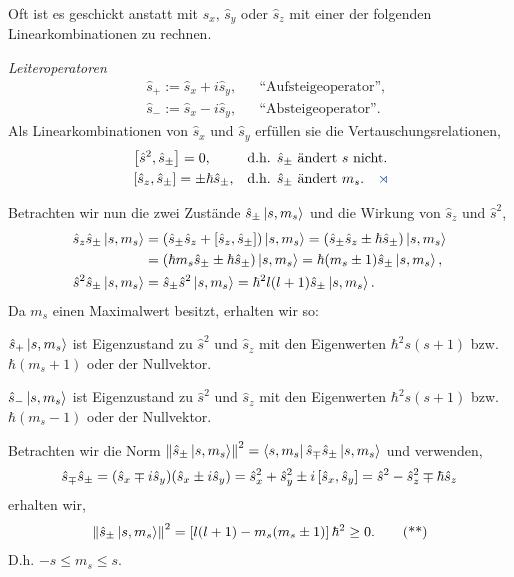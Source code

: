 Oft ist es geschickt anstatt mit $\hat{s}_x$, $\hat{s}_y$ oder $\hat{s}_z$ mit
einer der folgenden Linearkombinationen zu rechnen.
\begin{defnn}
\emph{Leiteroperatoren}
\begin{align*}
&\hat{s}_+ := \hat{s}_x + i\hat{s}_y,&& \text{``Aufsteigeoperator''},\\
&\hat{s}_- := \hat{s}_x - i\hat{s}_y,&& \text{``Absteigeoperator''}.
\end{align*}
Als Linearkombinationen von $\hat{s}_x$ und $\hat{s}_y$ erfüllen sie
die Vertauschungsrelationen,
\begin{align*}
&\nrm{\hat{s}^2,\hat{s}_\pm} = 0,&&\text{d.h. }\hat{s}_\pm\text{ ändert $s$
nicht}.\\ &\nrm{\hat{s}_z,\hat{s}_\pm} =\pm\hbar\hat{s}_\pm, &&\text{d.h.
$\hat{s}_\pm$ ändert $m_s$}.\fishhere
\end{align*}
\end{defnn}
Betrachten wir nun die zwei Zustände $\hat{s}_\pm\left|s,m_s\right\rangle $ und die Wirkung
von $\hat{s}_z$ und $\hat{s}^2$,
\begin{align*}
\hat{s}_z\hat{s}_\pm\left|s,m_s\right\rangle &= \left(\hat{s}_\pm\hat{s}_z +
\left[\hat{s}_z,\hat{s}_\pm\right]\right)\left|s,m_s\right\rangle
= \left(\hat{s}_\pm\hat{s}_z \pm
\hbar\hat{s}_\pm\right)\left|s,m_s\right\rangle
\\ &= \left( \hbar m_s\hat{s}_\pm \pm
\hbar\hat{s}_\pm\right)\left|s,m_s\right\rangle
= \hbar (m_s \pm 1)\hat{s}_\pm\left|s,m_s\right\rangle,\\
\hat{s}^2\hat{s}_\pm\left|s,m_s\right\rangle &= \hat{s}_\pm\hat{s}^2\left|s,m_s\right\rangle =
\hbar^2 l(l+1)\hat{s}_\pm\left|s,m_s\right\rangle.
\end{align*}
Da $m_s$ einen Maximalwert besitzt, erhalten wir so:

$\hat{s}_+\left|s,m_s\right\rangle$ ist Eigenzustand zu $\hat{s}^2$ und $\hat{s}_z$ mit
den Eigenwerten $\hbar^2s(s+1)$ bzw. $\hbar (m_s+1)$ oder der Nullvektor.

$\hat{s}_-\left|s,m_s\right\rangle$ ist Eigenzustand zu $\hat{s}^2$ und $\hat{s}_z$ mit
den Eigenwerten $\hbar^2s(s+1)$ bzw. $\hbar (m_s-1)$ oder der Nullvektor.

Betrachten wir die Norm 
$\left\|\hat{s}_\pm\left|s,m_s\right\rangle\right\|^2=\left\langle s,m_s\right|\hat{s}_\mp\hat{s}_\pm\left|s,m_s\right\rangle$
und verwenden,
\begin{align*}
\hat{s}_\mp\hat{s}_\pm = (\hat{s}_x\mp i\hat{s}_y)(\hat{s}_x\pm i\hat{s}_y) =
\hat{s}_x^2+\hat{s}_y^2 \pm i\left[\hat{s}_x,\hat{s}_y\right] = \hat{s}^2 -
\hat{s}_z^2 \mp \hbar\hat{s}_z
\end{align*}
erhalten wir,
\begin{align*}
\left\|\hat{s}_\pm\left|s,m_s\right\rangle\right\|^2 = \left[l(l+1) - m_s(m_s\pm1)\right]\hbar^2 \ge
0.\tag{**}
\end{align*}
D.h. $-s\le m_s \le s$.

